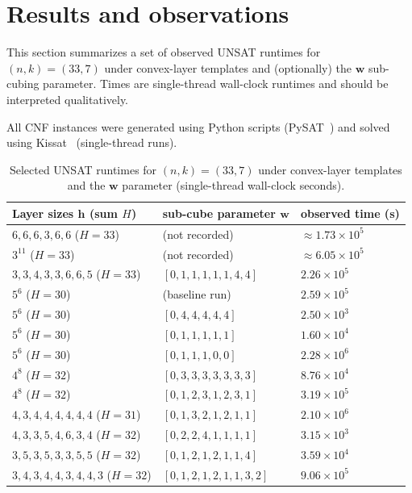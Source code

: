 \documentclass[11pt,a4paper]{article}
\theoremstyle{definition}
\begin{document}
\section{Results and observations}\label{sec:results}

This section summarizes a set of observed UNSAT runtimes for $(n,k)=(33,7)$ under convex-layer templates and (optionally) the $\mathbf{w}$ sub-cubing parameter. Times are single-thread wall-clock runtimes and should be interpreted qualitatively.

All CNF instances were generated using Python scripts (PySAT~\cite{pysat_library}) and solved using Kissat~\cite{kissat} (single-thread runs).


\begin{table}[h]
\centering
\begin{tabular}{@{}lll@{}}
\toprule
Layer sizes $\mathbf{h}$ (sum $H$) & sub-cube parameter $\mathbf{w}$ & observed time (s) \\ \midrule
$6,6,6,3,6,6$ ($H=33$) & (not recorded) & $\approx 1.73\times 10^{5}$ \\
$3^{11}$ ($H=33$) & (not recorded) & $\approx 6.05\times 10^{5}$ \\
$3,3,4,3,3,6,6,5$ ($H=33$) & $[0,1,1,1,1,1,4,4]$ & $2.26\times 10^{5}$ \\
\midrule
$5^6$ ($H=30$) & (baseline run) & $2.59\times 10^{5}$ \\
$5^6$ ($H=30$) & $[0,4,4,4,4,4]$ & $2.50\times 10^{3}$ \\
$5^6$ ($H=30$) & $[0,1,1,1,1,1]$ & $1.60\times 10^{4}$ \\
$5^6$ ($H=30$) & $[0,1,1,1,0,0]$ & $2.28\times 10^{6}$ \\
\midrule
$4^8$ ($H=32$) & $[0,3,3,3,3,3,3,3]$ & $8.76\times 10^{4}$ \\
$4^8$ ($H=32$) & $[0,1,2,3,1,2,3,1]$ & $3.19\times 10^{5}$ \\
$4,3,4,4,4,4,4,4$ ($H=31$) & $[0,1,3,2,1,2,1,1]$ & $2.10\times 10^{6}$ \\
$4,3,3,5,4,6,3,4$ ($H=32$) & $[0,2,2,4,1,1,1,1]$ & $3.15\times 10^{3}$ \\
\midrule
$3,5,3,5,3,3,5,5$ ($H=32$) & $[0,1,2,1,2,1,1,4]$ & $3.59\times 10^{4}$ \\
$3,4,3,4,4,3,4,4,3$ ($H=32$) & $[0,1,2,1,2,1,1,3,2]$ & $9.06\times 10^{5}$ \\
\bottomrule
\end{tabular}
\caption{Selected UNSAT runtimes for $(n,k)=(33,7)$ under convex-layer templates and the $\mathbf{w}$ parameter (single-thread wall-clock seconds).}
\label{tab:runtimes}
\end{table}
\end{document}
